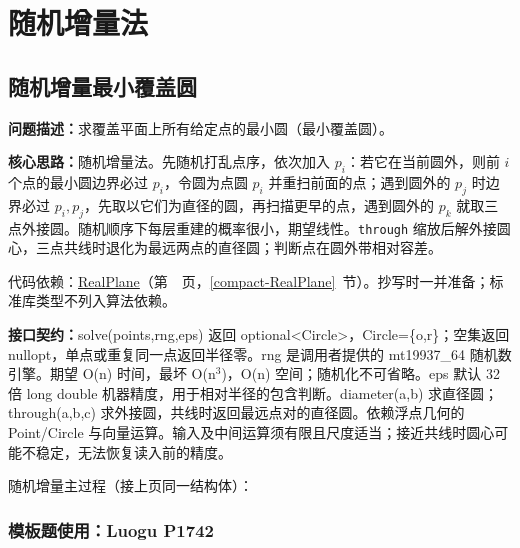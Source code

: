 

\Needspace{629pt}

\chapter{随机增量法}

\section{随机增量最小覆盖圆}\label{compact-EnclosingCircle}

\noindent\textbf{问题描述：}\allowbreak 求覆盖平面上所有给定点的最小圆（最小覆盖圆）。

\textbf{核心思路：}\allowbreak 随机增量法。先随机打乱点序，依次加入 $p_i$：若它在当前圆外，则前 $i$ 个点的最小圆边界必过 $p_i$，令圆为点圆 $p_i$ 并重扫前面的点；遇到圆外的 $p_j$ 时边界必过 $p_i,p_j$，先取以它们为直径的圆，再扫描更早的点，遇到圆外的 $p_k$ 就取三点外接圆。随机顺序下每层重建的概率很小，期望线性。\texttt{through} 缩放后解外接圆心，三点共线时退化为最远两点的直径圆；判断点在圆外带相对容差。

代码依赖：\hyperref[compact-RealPlane]{RealPlane}（第~\pageref{compact-RealPlane}~页，\ref{compact-RealPlane}~节）。抄写时一并准备；标准库类型不列入算法依赖。

{\sloppy{}\noindent\textbf{接口契约：}solve(points,rng,eps) 返回 optional<Circle>，Circle=\{o,r\}；空集返回 nullopt，单点或重复同一点返回半径零。rng 是调用者提供的 mt19937\_64 随机数引擎。期望 O(n) 时间，最坏 O(n$^{3}$)，O(n) 空间；随机化不可省略。eps 默认 32 倍 long double 机器精度，用于相对半径的包含判断。diameter(a,b) 求直径圆；through(a,b,c) 求外接圆，共线时返回最远点对的直径圆。依赖浮点几何的 Point/Circle 与向量运算。输入及中间运算须有限且尺度适当；接近共线时圆心可能不稳定，无法恢复读入前的精度。\par}

\Needspace{479pt}



\newpage

\noindent 随机增量主过程（接上页同一结构体）：



\Needspace{278pt}

\subsection*{模板题使用：Luogu P1742}


